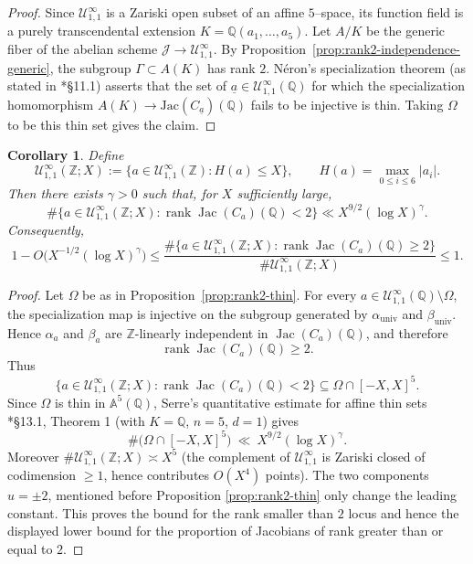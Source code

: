 \documentclass{amsart}
\newcommand{\Q}{{\mathbb Q}}
\newcommand{\Z}{{\mathbb Z}}
\newcommand{\cJ}{\mathcal{J}}
\newcommand{\cU}{\mathcal{U}}
\newcommand{\A}{\mathbb{A}}
\newcommand{\Jac}{\mathrm{Jac}}
\newcommand{\ua}{\underline{a}}
\newtheorem{corollary}[proposition]{Corollary}
\begin{document}
\begin{proof}


Since $\cU^{\infty}_{1,1}$ is a Zariski open subset of an affine $5$--space, its function field is
a purely transcendental extension $K=\Q(a_1,\dots,a_5)$.
Let $A/K$ be the generic fiber of the abelian scheme $\cJ\to \cU^{\infty}_{1,1}$.
By Proposition~\ref{prop:rank2-independence-generic}, the subgroup $\Gamma\subset A(K)$ has rank $2$.
N\'eron's specialization theorem (as stated in \cite{SerreMW}*{\S11.1}) asserts that the set of
$\ua\in \cU^{\infty}_{1,1}(\Q)$ for which the specialization homomorphism $A(K)\to \Jac(C_{\ua})(\Q)$
fails to be injective is thin. Taking $\Omega$ to be this thin set gives the claim.
\end{proof}

\begin{corollary}\label{cor:rank2-density-in-box}
Define
\[
\cU_{1,1}^\infty(\mathbb Z;X)
:=
\{a\in \cU_{1,1}^\infty(\mathbb Z): H(a)\le X\},
\qquad
H(a)=\max_{0\le i\le 6}|a_i|.
\]
Then there exists \(\gamma>0\) such that, for \(X\) sufficiently large,
\[
\#\{a\in \cU_{1,1}^\infty(\mathbb Z;X):
\operatorname{rank}\operatorname{Jac}(C_a)(\mathbb Q)<2\}
\ll X^{9/2}(\log X)^\gamma.
\]
Consequently,
\[
1-O\bigl(X^{-1/2}(\log X)^\gamma\bigr)
\le
\frac{
\#\{a\in \cU_{1,1}^\infty(\mathbb Z;X):
\operatorname{rank}\operatorname{Jac}(C_a)(\mathbb Q)\ge 2\}
}
{\#\cU_{1,1}^\infty(\mathbb Z;X)}
\le 1.
\]
\end{corollary}

\begin{proof}
Let $\Omega$ be as in Proposition~\ref{prop:rank2-thin}. For every
\(a\in \cU_{1,1}^\infty(\mathbb Q)\setminus\Omega\), the specialization map is
injective on the subgroup generated by \(\alpha_{\mathrm{univ}}\) and
\(\beta_{\mathrm{univ}}\). Hence \(\alpha_a\) and \(\beta_a\) are
\(\mathbb Z\)-linearly independent in \(\operatorname{Jac}(C_a)(\mathbb Q)\), and
therefore
\[
\operatorname{rank}\operatorname{Jac}(C_a)(\mathbb Q)\ge 2.
\]
Thus
\[
\{a\in \cU_{1,1}^\infty(\mathbb Z;X):
\operatorname{rank}\operatorname{Jac}(C_a)(\mathbb Q)<2\}
\subseteq
\Omega\cap[-X,X]^5.
\]
Since $\Omega$ is thin in $\A^5(\Q)$, Serre's
quantitative estimate for affine thin sets \cite{SerreMW}*{\S13.1, Theorem 1} (with $K=\Q$, $n=5$, $d=1$)
gives
\[
\#\bigl(\Omega\cap[-X,X]^5\bigr)\ \ll\ X^{9/2}(\log X)^{\gamma}.
\]
Moreover $\#\cU^{\infty}_{1,1}(\Z;X)\asymp X^5$ (the complement of $\cU^{\infty}_{1,1}$ is Zariski
closed of codimension $\ge 1$, hence contributes $O(X^4)$ points). The two components $u=\pm2$, mentioned before Proposition \ref{prop:rank2-thin} only change the leading constant. This proves the bound for
the rank smaller than \(2\) locus and hence the displayed lower bound for the proportion of Jacobians of rank greater than or equal to \(2\).
\end{proof}
\end{document}
